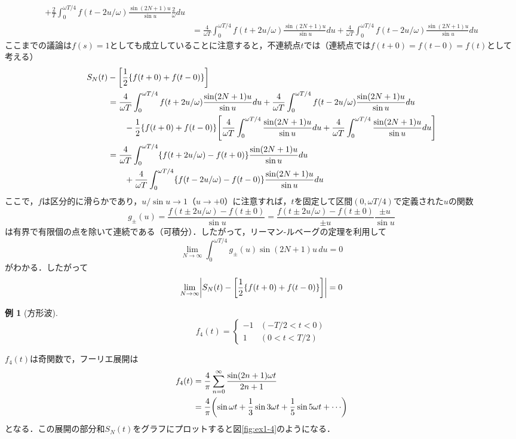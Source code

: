 \documentclass[dvipdfmx,a4j,10pt]{jsarticle}
\makeatletter
\theoremstyle{mystyle1}
\theoremstyle{mystyle3}
\newtheorem{example}{例}[section]
\theoremstyle{mystyle4}
\theoremstyle{mystyle2}
\renewenvironment{proof}[1][\proofname]{\par
  \pushQED{\qed}%
  \normalfont
  \topsep6\p@\@plus6\p@ \trivlist
  \item[\hskip\labelsep{\bfseries\sffamily #1}]\ignorespaces
}{%
  \popQED\endtrivlist\@endpefalse
}
\renewcommand\proofname{証明}
\newenvironment{ex}[1][]
{\begin{tcolorbox}[
    enhanced,
    boxrule=0pt,
    arc=0mm,
    frame hidden,
    borderline west={0.25pt}{-4pt}{black},
    borderline west={0.25pt}{-2.25pt}{black},
    breakable = true
    ]
    \begin{example}[#1]
}
{\end{example}\end{tcolorbox}}
\makeatother
\begin{document}
\begin{proof}
\[\begin{split}
            +\frac{2}{T}\int_0^{\omega T/4} f(t-2u/\omega)\frac{\sin(2N+1)u}{\sin u}\frac{2}{\omega}du \\
            &= \frac{4}{\omega T}\int_0^{\omega T/4} f(t+2u/\omega)\frac{\sin(2N+1)u}{\sin u}du
            +\frac{4}{\omega T}\int_0^{\omega T/4} f(t-2u/\omega)\frac{\sin(2N+1)u}{\sin u}du
        \end{split}
    \]
    ここまでの議論は$f(s)=1$としても成立していることに注意すると，不連続点$t$では（連続点では$f(t+0)=f(t-0)=f(t)$として考える）
    \[
        \begin{split}
            S_N(t)&-\mleft[\frac{1}{2}\{f(t+0)+f(t-0)\}\mright] \\
            &=\frac{4}{\omega T}\int_0^{\omega T/4} f(t+2u/\omega)\frac{\sin(2N+1)u}{\sin u}du
            +\frac{4}{\omega T}\int_0^{\omega T/4} f(t-2u/\omega)\frac{\sin(2N+1)u}{\sin u}du \\
            & \qquad -\frac{1}{2}\{f(t+0)+f(t-0)\}\mleft[\frac{4}{\omega T}\int_0^{\omega T/4} \frac{\sin(2N+1)u}{\sin u}du
                +\frac{4}{\omega T}\int_0^{\omega T/4} \frac{\sin(2N+1)u}{\sin u}du\mright] \\
            &= \frac{4}{\omega T}\int_0^{\omega T/4} \{f(t+2u/\omega)-f(t+0)\}\frac{\sin(2N+1)u}{\sin u}du \\
            & \qquad +\frac{4}{\omega T}\int_0^{\omega T/4} \{f(t-2u/\omega)-f(t-0)\}\frac{\sin(2N+1)u}{\sin u}du
        \end{split}
    \]
    ここで，$f$は区分的に滑らかであり，$u/\sin u\to 1$（$u\to +0$）に注意すれば，$t$を固定して区間$(0,\omega T/4)$で定義された$u$の関数
    \[
        g_\pm(u)=\frac{f(t\pm 2u/\omega)-f(t\pm 0)}{\sin u}=\frac{f(t\pm 2u/\omega)-f(t\pm 0)}{\pm u}\frac{\pm u}{\sin u}
    \]
    は有界で有限個の点を除いて連続である（可積分）．したがって，リーマン-ルベーグの定理を利用して
    \[
        \lim_{N\to\infty}\int_0^{\omega T/4}g_\pm(u)\sin(2N+1)u\, du=0
    \]
    がわかる．したがって
    \[
        \lim_{N\to\infty}\mleft|S_N(t)-\mleft[\frac{1}{2}\{f(t+0)+f(t-0)\}\mright]\mright|=0
    \]
\end{proof}

\begin{ex}[方形波]
    \[
        f_4(t)=\begin{cases}
            -1 & (-T/2<t<0) \\
            1  & (0<t<T/2)
        \end{cases}
    \]
\end{ex}

$f_4(t)$は奇関数で，フーリエ展開は
\[
    \begin{split}
        f_4(t)
        &=\frac{4}{\pi}\sum_{n=0}^\infty \frac{\sin(2n+1)\omega t}{2n+1} \\
        &=\frac{4}{\pi}\mleft(\sin\omega t+\frac{1}{3}\sin3\omega t+\frac{1}{5}\sin5\omega t+\cdots\mright)
    \end{split}
\]
となる．この展開の部分和$S_N(t)$をグラフにプロットすると図\ref{fig:ex1-4}のようになる．
\end{document}
